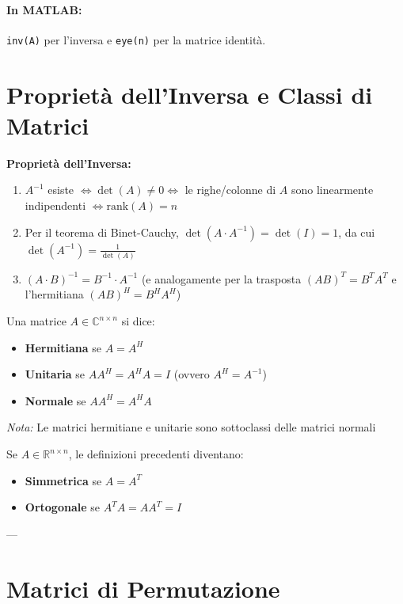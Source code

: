 \documentclass[a4paper,12pt]{article}
\begin{document}
	\paragraph{In MATLAB:} \texttt{inv(A)} per l'inversa e \texttt{eye(n)} per la matrice identità.
	\section*{Proprietà dell'Inversa e Classi di Matrici}
	
	\textbf{Proprietà dell'Inversa:}
	\begin{enumerate}
		\item $A^{-1}$ esiste $\iff \det(A) \neq 0 \iff$ le righe/colonne di $A$ sono linearmente indipendenti $\iff \text{rank}(A) = n$
		\item Per il teorema di Binet-Cauchy, $\det(A \cdot A^{-1}) = \det(I) = 1$, da cui $\det(A^{-1}) = \frac{1}{\det(A)}$
		\item $(A \cdot B)^{-1} = B^{-1} \cdot A^{-1}$ (e analogamente per la trasposta $(AB)^T = B^T A^T$ e l'hermitiana $(AB)^H = B^H A^H$)
	\end{enumerate}
	
	\begin{tcolorbox}[title=Definizione: Matrici Speciali ($\mathbb{C}^{n \times n}$)]
		Una matrice $A \in \mathbb{C}^{n \times n}$ si dice:
		\begin{itemize}
			\item \textbf{Hermitiana} se $A = A^H$
			\item \textbf{Unitaria} se $AA^H = A^H A = I$ (ovvero $A^H = A^{-1}$)
			\item \textbf{Normale} se $AA^H = A^H A$
		\end{itemize}
		\textit{Nota:} Le matrici hermitiane e unitarie sono sottoclassi delle matrici normali
	\end{tcolorbox}
	
	\begin{tcolorbox}[title=Definizione: Caso Reale ($\mathbb{R}^{n \times n}$)]
		Se $A \in \mathbb{R}^{n \times n}$, le definizioni precedenti diventano:
		\begin{itemize}
			\item \textbf{Simmetrica} se $A = A^T$
			\item \textbf{Ortogonale} se $A^T A = AA^T = I$
		\end{itemize}
	\end{tcolorbox}
	
	---
	
	\section*{Matrici di Permutazione}
	
\end{document}
